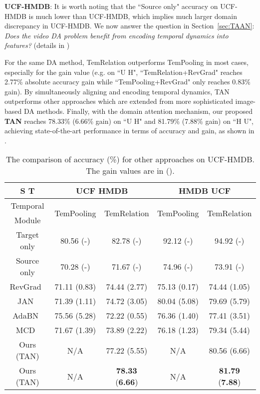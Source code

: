 \documentclass[10pt,twocolumn,letterpaper]{article}
\begin{document}
\noindent\textbf{UCF-HMDB}:
It is worth noting that the ``Source only" accuracy on UCF-HMDB is much lower than UCF-HMDB, 
which implies much larger domain discrepancy in UCF-HMDB.
We now answer the question in Section~\ref{sec:TAAN}:
\textit{Does the video DA problem benefit from encoding temporal dynamics into features?} (details in )

For the same DA method, TemRelation outperforms TemPooling in most cases, especially for the gain value (e.g. on ``U  H", ``TemRelation+RevGrad" reaches 2.77\% absolute accuracy gain while ``TemPooling+RevGrad" only reaches 0.83\% gain).
By simultaneously aligning and encoding temporal dynamics, TAN 
outperforms other approaches which are extended from more sophisticated image-based DA methods. 
Finally, with the domain attention mechanism, our proposed \textbf{TAN} reaches 
78.33\%  (6.66\% gain) on ``U  H" and 81.79\% (7.88\% gain) on ``H  U", achieving state-of-the-art performance in terms of accuracy and gain, as shown in .

\begin{table}[!t]
\centering
\scriptsize
    \begin{tabular}{c|c|c|c|c}
    S  T & \multicolumn{2}{c|}{UCF  HMDB} & \multicolumn{2}{c}{HMDB  UCF} \\ \hline
    Temporal & \multirow{2}{*}{TemPooling} & \multirow{2}{*}{TemRelation} & \multirow{2}{*}{TemPooling} & \multirow{2}{*}{TemRelation} \\ 
    Module &  &  &  &  \\ \hline
Target only & 80.56 (-) & 82.78 (-) & 92.12 (-) & 94.92 (-) \\ \hline
    Source only & 70.28 (-) & 71.67 (-) & 74.96 (-) & 73.91 (-) \\ 
    RevGrad~\cite{ganin2015unsupervised} & 71.11 (0.83) & 74.44 (2.77) & 75.13 (0.17) & 74.44 (1.05) \\ 
    JAN~\cite{long2017deep} & 71.39 (1.11) & 74.72 (3.05) & 80.04 (5.08) & 79.69 (5.79) \\ 
    AdaBN~\cite{li2018adaptive} & 75.56 (5.28) & 72.22 (0.55) & 76.36 (1.40) & 77.41 (3.51) \\ 
    MCD~\cite{saito2018maximum} & 71.67 (1.39) & 73.89 (2.22) & 76.18 (1.23) & 79.34 (5.44) \\ \hline
    Ours (TAN) & N/A & 77.22 (5.55) & N/A & 80.56 (6.66) \\ 
    Ours (TAN) & N/A & \textbf{78.33} (\textbf{6.66}) & N/A & \textbf{81.79} (\textbf{7.88}) \\ \hline
    \end{tabular}
\caption{The comparison of accuracy (\%) for other approaches on UCF-HMDB. The gain values are in ().  
}
\label{table:sota_ucf-hmdb_full}
\end{table}
\end{document}
